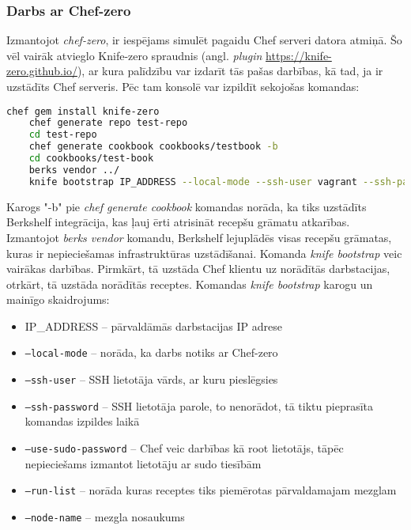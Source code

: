 \subsubsection{Darbs ar Chef-zero}
Izmantojot \textit{chef-zero}, ir iespējams simulēt pagaidu Chef serveri datora atmiņā. Šo vēl vairāk atvieglo Knife-zero spraudnis (angl. \textit{plugin} \url{https://knife-zero.github.io/}), ar kura palīdzību var izdarīt tās pašas darbības, kā tad, ja ir uzstādīts Chef serveris.
Pēc tam konsolē var izpildīt sekojošas komandas:
\begin{lstlisting}[language=bash]
	chef gem install knife-zero
	chef generate repo test-repo
	cd test-repo
	chef generate cookbook cookbooks/testbook -b
	cd cookbooks/test-book
	berks vendor ../
	knife bootstrap IP_ADDRESS --local-mode --ssh-user vagrant --ssh-password 'vagrant' --sudo --use-sudo-password --run-list 'recipe[testbook]' --node-name chefnode
\end{lstlisting}
Karogs "-b" pie \textit{chef generate cookbook} komandas norāda, ka tiks uzstādīts Berkshelf integrācija, kas ļauj ērti atrisināt recepšu grāmatu atkarības.
Izmantojot \textit{berks vendor} komandu, Berkshelf lejuplādēs visas recepšu grāmatas, kuras ir nepieciešamas infrastruktūras uzstādīšanai.
Komanda \textit{knife bootstrap} veic vairākas darbības. Pirmkārt, tā uzstāda Chef klientu uz norādītās darbstacijas, otrkārt, tā uzstāda norādītās receptes.
Komandas \textit{knife bootstrap} karogu un mainīgo skaidrojums:
\begin{itemize}
	\item IP_ADDRESS -- pārvaldāmās darbstacijas IP adrese
	\item \texttt{--local-mode} -- norāda, ka darbs notiks ar Chef-zero
	\item \texttt{--ssh-user} -- SSH lietotāja vārds, ar kuru pieslēgsies
	\item \texttt{--ssh-password} -- SSH lietotāja parole, to nenorādot, tā tiktu pieprasīta komandas izpildes laikā
	\item \texttt{--use-sudo-password} -- Chef veic darbības kā root lietotājs, tāpēc nepieciešams izmantot lietotāju ar sudo tiesībām
	\item \texttt{--run-list} -- norāda kuras receptes tiks piemērotas pārvaldamajam mezglam
	\item \texttt{--node-name} -- mezgla nosaukums
\end{itemize}

